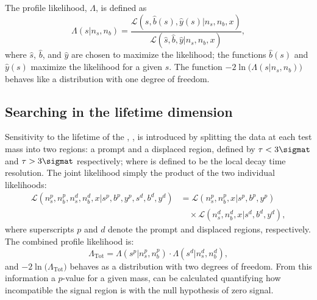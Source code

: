 
The profile likelihood, $\Lambda$, is defined as
\begin{equation}
  \Lambda(s|n_s,n_b) =
  \frac
  {\mathcal{L}(s, \hat{b}(s), \hat{y}(s) | n_s, n_b, x)}
  {\mathcal{L}(\hat{s}, \hat{b}, \hat{y} | n_s, n_b, x)},
  \label{eq:profilelike1}
\end{equation}
where $\hat{s}$, $\hat{b}$, and $\hat{y}$ are chosen to maximize the likelihood; the functions
$\hat{b}(s)$ and $\hat{y}(s)$ maximize the likelihood for a given $s$.
The function $-2\ln\big(\Lambda(s|n_s,n_b)\big)$ behaves like a \chisq distribution with one degree
of freedom.


\subsection{Searching in the lifetime dimension}
Sensitivity to the lifetime of the \db, \lifetime{\db}, is introduced by splitting the data at each
test mass into two regions: a prompt and a displaced region, defined by $\tau<3\sigmat$ and
$\tau>3\sigmat$ respectively; where \sigmat is defined to be the local decay time resolution.
The joint likelihood simply the product of the two individual likelihoods:
\begin{align}
  \mathcal{L}(n^p_s, n^p_b, n^d_s, n^d_b, x | s^p, b^p, y^p, s^d, b^d, y^d) &=
  \mathcal{L}(n^p_s, n^p_b, x | s^p, b^p, y^p)\nonumber\\
  &\quad\times\mathcal{L}(n^d_s, n^d_b, x | s^d, b^d, y^d),
  \label{eq:db:liketau}
\end{align}
where superscripts $p$ and $d$ denote the prompt and displaced regions,
respectively.
The combined profile likelihood is:
\begin{equation}
  \Lambda_\mathrm{Tot}
  =
  \Lambda(s^p|n_s^p,n_b^p)\cdot
  \Lambda(s^d|n_s^d,n_b^d),
\end{equation}
and $-2\ln\big(\Lambda_\mathrm{Tot}\big)$ behaves as a \chisq distribution with two
degrees of freedom.
From this information a $p$-value for a given mass, can be calculated
quantifying how incompatible the signal region is with the null
hypothesis of zero signal.

